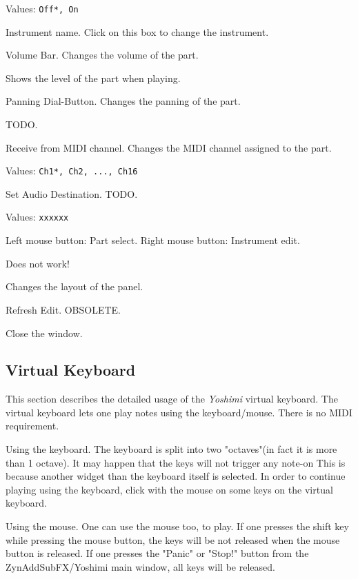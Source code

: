    Values: \texttt{Off*, On}

   Instrument name. Click on this box to change the instrument.

   Volume Bar.
   Changes the volume of the part.

   Shows the level of the part when playing.

   Panning Dial-Button.
   Changes the panning of the part.

   TODO.

   Receive from MIDI channel.
   Changes the MIDI channel assigned to the part.

   Values: \texttt{Ch1*, Ch2, ..., Ch16}

   Set Audio Destination.
   TODO.

   Values: \texttt{xxxxxx}

   Left mouse button: Part select.
   Right mouse button: Instrument edit.

   Does not work!

   Changes the layout of the panel.

   Refresh Edit. OBSOLETE.

   Close the window.

\subsection{Virtual Keyboard}
\label{subsec:virtual_keyboard}

   This section describes the detailed usage of the
   \textsl{Yoshimi} virtual keyboard.
   The virtual keyboard lets one play notes using the keyboard/mouse. There is
   no MIDI requirement. 
    
   Using the keyboard. The keyboard is split into two "octaves"(in fact it is
   more than 1 octave). It may happen that the keys will not trigger any
   note-on This is because another widget than the keyboard itself is selected.
   In order to continue playing using the keyboard, click with the mouse on
   some keys on the virtual keyboard.
   
   Using the mouse. One can use the mouse too, to play.
   If one presses the shift key while pressing the mouse button,
   the keys will be not released when the mouse button is released.  If one
   presses the "Panic" or "Stop!" button from the ZynAddSubFX/Yoshimi
   main window, all keys will be released. 

